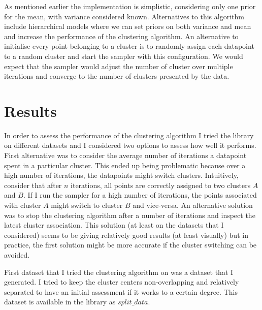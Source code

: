 \documentclass[12pt,a4paper]{article}
\begin{document}
As mentioned earlier the implementation is simplistic, considering only one prior for the mean, with variance considered known. Alternatives to this algorithm include hierarchical models where we can set priors on both variance and mean and increase the performance of the clustering algorithm. An alternative to initialise every point belonging to a cluster is to randomly assign each datapoint to a random cluster and start the sampler with this configuration. We would expect that the sampler would adjust the number of cluster over multiple iterations and converge to the number of clusters presented by the data.

\section{Results}
In order to assess the performance of the clustering algorithm I tried the library on different datasets and I considered two options to assess how well it performs. First alternative was to consider the average number of iterations a datapoint spent in a particular cluster. This ended up being problematic because over a high number of iterations, the datapoints might switch clusters. Intuitively, consider that after $n$ iterations, all points are correctly assigned to two clusters $A$ and $B$. If I run the sampler for a high number of iterations, the points associated with cluster $A$ might switch to cluster $B$ and vice-versa. An alternative solution was to stop the clustering algorithm after a number of iterations and inspect the latest cluster association. This solution (at least on the datasets that I considered) seems to be giving relatively good results (at least visually) but in practice, the first solution might be more accurate if the cluster switching can be avoided.

First dataset that I tried the clustering algorithm on was a dataset that I generated. I tried to keep the cluster centers non-overlapping and relatively separated to have an initial assessment if it works to a certain degree. This dataset is available in the library as $split\_data$.
\end{document}
